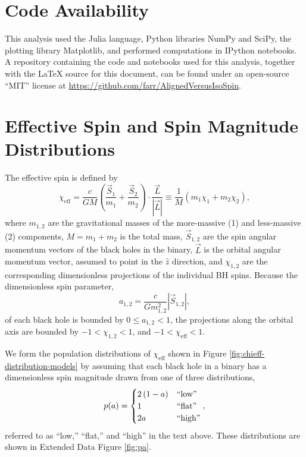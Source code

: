 \documentclass{nature-arxiv}
\newcommand{\chieff}{\chi_\mathrm{eff}}
\begin{document}
\begin{methods}

\setcounter{figure}{0}
\renewcommand{\figurename}{Extended Data Figure}

\section{Code Availability}

This analysis used the Julia language\cite{Julia}, Python libraries
NumPy and SciPy\cite{NumPy,SciPy}, the plotting library
Matplotlib\cite{Matplotlib}, and performed computations in IPython
notebooks\cite{IPython}.  A repository containing the code and
notebooks used for this analysis, together with the \LaTeX{} source
for this document, can be found under an open-source ``MIT'' license
at \url{https://github.com/farr/AlignedVersusIsoSpin}.

\section{Effective Spin and Spin Magnitude Distributions}
\label{methsec:chieff-spin-magnitude}

The effective spin is defined by\cite{2016PhRvL.116x1102A} 
\begin{equation}
  \chieff = \frac{c}{GM} \left( \frac{\vec{S}_1}{m_1} + \frac{\vec{S}_2}{m_2}
  \right) \cdot \frac{\vec{L}}{\left| \vec{L} \right|} \equiv \frac{1}{M} \left( m_1 \chi_1 + m_2 \chi_2 \right),
\end{equation}
where $m_{1,2}$ are the gravitational masses of the more-massive (1)
and less-massive (2) components, $M = m_1 + m_2$ is the total mass,
$\vec{S}_{1,2}$ are the spin angular momentum vectors of the black
holes in the binary, $\vec{L}$ is the orbital angular momentum vector,
assumed to point in the $\hat{z}$ direction, and $\chi_{1,2}$ are the
corresponding dimensionless projections of the individual \ac{BH}
spins.  Because the dimensionless spin parameter,
\begin{equation}
  \label{eq:a-def}
  a_{1,2} = \frac{c}{G m_{1,2}^2} \left|\vec{S}_{1,2} \right|,
\end{equation}
of each black hole is bounded by $0 \leq a_{1,2} < 1$, the projections
along the orbital axis are bounded by $-1 < \chi_{1,2} < 1$, and
$-1 < \chieff < 1$.

We form the population distributions of $\chieff$ shown in Figure
\ref{fig:chieff-distribution-models} by assuming that each black hole
in a binary has a dimensionless spin magnitude drawn from one of three
distributions,
\begin{equation}
  \label{eq:magnitude-dists}
  p(a) = \begin{cases}
    2\left(1-a \right) & \textnormal{``low''} \\
    1 & \textnormal{``flat''} \\
    2 a & \textnormal{``high''}
  \end{cases},
\end{equation}
referred to as ``low,'' ``flat,'' and ``high'' in the text above.
These distributions are shown in Extended Data Figure \ref{fig:pa}.


\end{methods}
\end{document}

